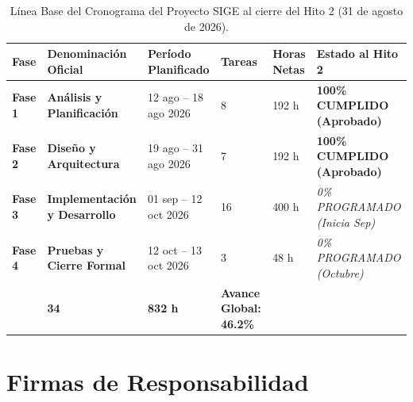 \documentclass[12pt,a4paper]{article}
\begin{document}
\begin{table}[H]
\centering
\small
\renewcommand{\arraystretch}{1.2}
\begin{tabularx}{\textwidth}{|>{\hsize=0.6\hsize\centering\arraybackslash\footnotesize}X|>{\hsize=1.3\hsize\raggedright\arraybackslash\bfseries\footnotesize}X|>{\hsize=1.1\hsize\centering\arraybackslash\footnotesize}X|>{\hsize=0.5\hsize\centering\arraybackslash\footnotesize}X|>{\hsize=0.6\hsize\centering\arraybackslash\footnotesize}X|>{\hsize=1.9\hsize\centering\arraybackslash\footnotesize}X|}
\hline
\rowcolor{tableheader}
\textbf{Fase} & \textbf{Denominación Oficial} & \textbf{Período Planificado} & \textbf{Tareas} & \textbf{Horas Netas} & \textbf{Estado al Hito 2} \\
\hline
\textbf{Fase 1} & Análisis y Planificación & 12 ago -- 18 ago 2026 & 8 & 192 h & \textbf{100\% CUMPLIDO (Aprobado)} \\
\hline
\textbf{Fase 2} & Diseño y Arquitectura & 19 ago -- 31 ago 2026 & 7 & 192 h & \textbf{100\% CUMPLIDO (Aprobado)} \\
\hline
\textbf{Fase 3} & Implementación y Desarrollo & 01 sep -- 12 oct 2026 & 16 & 400 h & \textit{0\% PROGRAMADO (Inicia Sep)} \\
\hline
\textbf{Fase 4} & Pruebas y Cierre Formal & 12 oct -- 13 oct 2026 & 3 & 48 h & \textit{0\% PROGRAMADO (Octubre)} \\
\hline
\multicolumn{3}{|r|}{\textbf{TOTAL GENERAL DEL PROYECTO:}} & \textbf{34} & \textbf{832 h} & \textbf{Avance Global: 46.2\%} \\
\hline
\end{tabularx}
\caption{Línea Base del Cronograma del Proyecto SIGE al cierre del Hito 2 (31 de agosto de 2026).}
\label{tab:linea_base_hito2}
\end{table}

\section{Firmas de Responsabilidad}
\end{document}
